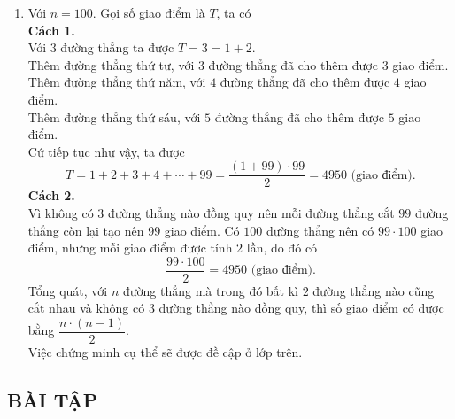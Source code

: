 \begin{vd}
{\begin{enumerate}
\begin{enumEX}{3}
			\end{enumEX}
			\item Với $n=100$. Gọi số giao điểm là $T$, ta có\\
			\textbf{Cách 1.\\}
			Với $3$ đường thẳng ta được $T=3=1+2$.\\
			Thêm đường thẳng thứ tư, với $3$ đường thẳng đã cho thêm được $3$ giao điểm.\\
			Thêm đường thẳng thứ năm, với $4$ đường thẳng đã cho thêm được $4$ giao điểm.\\
			Thêm đường thẳng thứ sáu, với $5$ đường thẳng đã cho thêm được $5$ giao điểm.\\
			Cứ tiếp tục như vậy, ta được
			\[T=1+2+3+4+\cdots+99=\dfrac{(1+99) \cdot 99}{2}=4950 \text{ (giao điểm)}.\]
			\textbf{Cách 2.\\}
			Vì không có $3$ đường thẳng nào đồng quy nên mỗi đường thẳng cắt $99$ đường thẳng còn lại tạo nên $99$ giao điểm. Có $100$ đường thẳng nên có $99 \cdot 100$ giao điểm, nhưng mỗi giao điểm được tính $2$ lần, do đó có
			\[\dfrac{99 \cdot 100}{2} = 4950 \text{ (giao điểm)}.\]
			Tổng quát, với $n$ đường thẳng mà trong đó bất kì $2$ đường thẳng nào cũng cắt nhau và không có $3$ đường thẳng nào đồng quy, thì số giao điểm có được bằng $\dfrac{n \cdot (n-1)}{2}$.\\
			Việc chứng minh cụ thể sẽ được đề cập ở lớp trên.
		\end{enumerate}
	}
\end{vd}

\subsection{BÀI TẬP}

